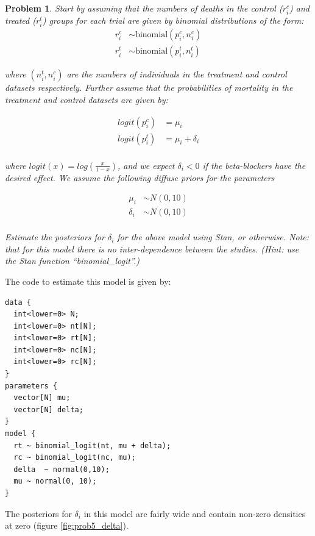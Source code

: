 \documentclass{article}
\newtheorem{problem}{Problem}[section]
\begin{document}
\begin{problem}
	Start by assuming that the numbers of deaths in the control ($r^c_i$) and treated ($r^t_i$) groups for each trial are given by binomial distributions of the form:
	\begin{align}
	r^c_i &\sim \text{binomial}(p^c_i,n^c_i)\\
	r^t_i &\sim \text{binomial}(p^t_i,n^t_i)
	\end{align}
	
	where $(n^t_i,n^c_i)$ are the numbers of individuals in the treatment and control datasets respectively. Further assume that the probabilities of mortality in the treatment and control datasets are given by:
	
	\begin{align}
	logit(p^c_i) &= \mu_i\\
	logit(p^t_i) &= \mu_i + \delta_i \\
	\end{align}
	
	where $logit(x) = log\left(\frac{x}{1-x}\right)$, and we expect $\delta_i<0$ if the beta-blockers have the desired effect.  We assume the following diffuse priors for the parameters
	
	\begin{align}
	\mu_i&\sim N(0,10)\\
	\delta_i &\sim N(0,10)\\
	\end{align}
	
	Estimate the posteriors for $\delta_i$ for the above model using Stan, or otherwise. Note: that for this model there is no inter-dependence between the studies. (Hint: use the Stan function ``binomial\_logit''.)
\end{problem}

The code to estimate this model is given by:

\begin{verbatim}
data {
  int<lower=0> N; 
  int<lower=0> nt[N]; 
  int<lower=0> rt[N]; 
  int<lower=0> nc[N]; 
  int<lower=0> rc[N]; 
} 
parameters {
  vector[N] mu;
  vector[N] delta;
} 
model {
  rt ~ binomial_logit(nt, mu + delta);
  rc ~ binomial_logit(nc, mu);
  delta  ~ normal(0,10); 
  mu ~ normal(0, 10);
}
\end{verbatim}

The posteriors for $\delta_i$ in this model are fairly wide and contain non-zero densities at zero (figure \ref{fig:prob5_delta}).
\end{document}
